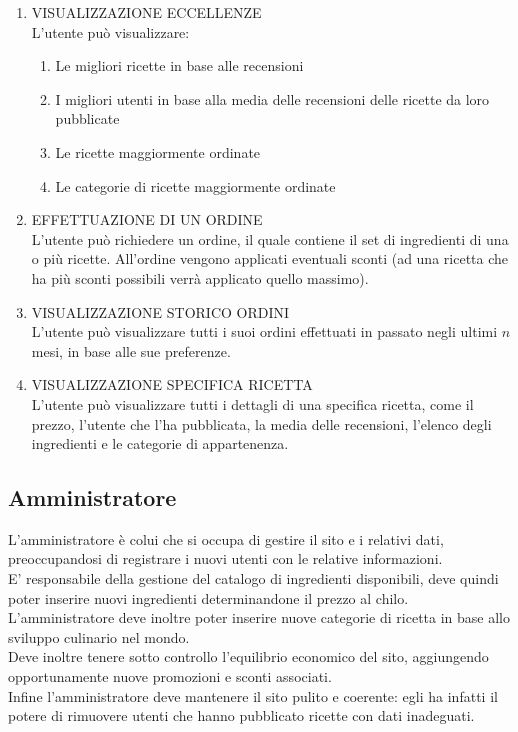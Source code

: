 \begin{enumerate}[label=\textbf{U\arabic* - }, leftmargin=1.2cm, itemsep=0.8em]
    \item VISUALIZZAZIONE ECCELLENZE\\
    L’utente può visualizzare:
    \begin{enumerate}[label=\textbf{U8.\arabic* - }, leftmargin=1.2cm, itemsep=0.2em, topsep=0.3em]
        \item Le migliori ricette in base alle recensioni
        \item I migliori utenti in base alla media delle recensioni delle ricette da loro pubblicate
        \item Le ricette maggiormente ordinate
        \item Le categorie di ricette maggiormente ordinate
    \end{enumerate}

    \item EFFETTUAZIONE DI UN ORDINE\\
    L’utente può richiedere un ordine, il quale contiene il set di ingredienti di una o più ricette. All’ordine vengono applicati eventuali sconti (ad una ricetta che ha più sconti possibili verrà applicato quello massimo).

    \item VISUALIZZAZIONE STORICO ORDINI\\
    L’utente può visualizzare tutti i suoi ordini effettuati in passato negli ultimi $n$ mesi, in base alle sue preferenze.

    \item VISUALIZZAZIONE SPECIFICA RICETTA\\
    L’utente può visualizzare tutti i dettagli di una specifica ricetta, come il prezzo, l’utente che l’ha pubblicata, la media delle recensioni, l’elenco degli ingredienti e le categorie di appartenenza.

\end{enumerate}

\subsection{Amministratore}

L’amministratore è colui che si occupa di gestire il sito e i relativi dati, preoccupandosi di registrare i nuovi utenti con le relative informazioni.\\
E’ responsabile della gestione del catalogo di ingredienti disponibili, deve quindi poter inserire nuovi ingredienti determinandone il prezzo al chilo.\\
L’amministratore deve inoltre poter inserire nuove categorie di ricetta in base allo sviluppo culinario nel mondo.\\
Deve inoltre tenere sotto controllo l’equilibrio economico del sito, aggiungendo opportunamente nuove promozioni e sconti associati.\\
Infine l’amministratore deve mantenere il sito pulito e coerente: egli ha infatti il potere di rimuovere utenti che hanno pubblicato ricette con dati inadeguati.

